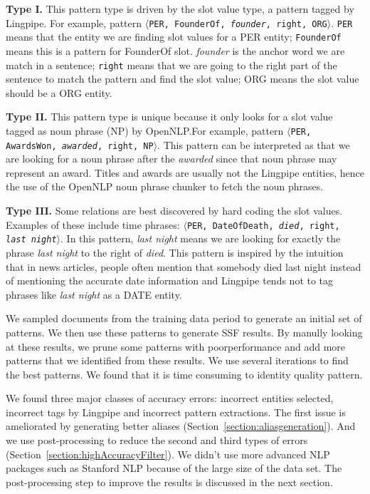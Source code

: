 \textbf{Type I.} This pattern type is driven by the slot value type, a pattern
tagged by Lingpipe. For example, pattern
$\langle$\texttt{PER, FounderOf, \textit{founder}, right, ORG}$\rangle$. \texttt{PER} means 
that the entity we are finding slot values for a PER entity; \texttt{FounderOf} 
means this is a pattern for FounderOf slot. \textit{founder} is the anchor word we are 
match in a sentence; \texttt{right} means that we are going to the 
right part of the sentence to match the pattern and find the slot value; ORG 
means the slot value should be a ORG entity.

\textbf{Type II.} This pattern type is unique because it only looks for a
slot value tagged as noun phrase (NP) by OpenNLP.\@ For example,
pattern $\langle$\texttt{PER, AwardsWon, \textit{awarded}, 
right, NP}$\rangle$. This pattern can be interpreted 
as that we are looking for a noun phrase after the \textit{awarded} since that noun 
phrase may represent an award. Titles and awards are usually 
not the Lingpipe entities, hence the use of the OpenNLP noun phrase chunker to fetch the 
noun phrases.

\textbf{Type III.} Some relations are best discovered by hard coding the slot values.
Examples of these include time phrases: $\langle$\texttt{PER, DateOfDeath, \textit{died}, right, 
\textit{last night}}$\rangle$. In this pattern, \textit{last night} means we are looking for 
exactly the phrase \textit{last night} to the right of \textit{died}. This pattern is 
inspired by the intuition that in news articles, people often mention that 
somebody died last night instead of mentioning the accurate date information 
and Lingpipe tends not to tag phrases like \textit{last night} as a DATE entity. 

We sampled documents from the training data period to generate an initial set of patterns. We then use these patterns to generate SSF results. By manully looking at these results, we prune some patterns with poor­performance and add more patterns that we identified from these results. We use several iterations to find the best patterns. We found that it is time consuming to identity quality pattern.


We found three major classes of accuracy errors:
incorrect entities selected, incorrect tags by Lingpipe and incorrect pattern extractions.
The first issue is ameliorated by generating better aliases (Section~\ref{section:aliasgeneration}). And we use
post-processing to reduce the second and third types of errors (Section~\ref{section:highAccuracyFilter}).
We didn't use more advanced NLP packages such as Stanford NLP because of the large size of the data set.
The post-processing step to improve the results is discussed in the next section.

